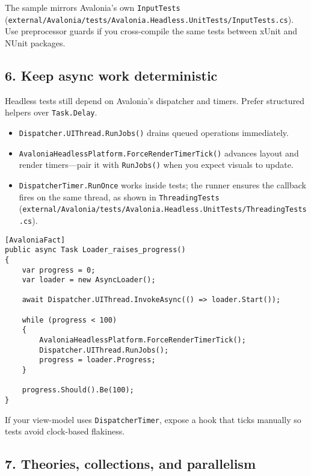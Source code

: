 The sample mirrors Avalonia's own \passthrough{\lstinline!InputTests!}
(\passthrough{\lstinline!external/Avalonia/tests/Avalonia.Headless.UnitTests/InputTests.cs!}).
Use preprocessor guards if you cross-compile the same tests between
xUnit and NUnit packages.

\subsection{6. Keep async work
deterministic}\label{keep-async-work-deterministic}

Headless tests still depend on Avalonia's dispatcher and timers. Prefer
structured helpers over \passthrough{\lstinline!Task.Delay!}.

\begin{itemize}
\tightlist
\item
  \passthrough{\lstinline!Dispatcher.UIThread.RunJobs()!} drains queued
  operations immediately.
\item
  \passthrough{\lstinline!AvaloniaHeadlessPlatform.ForceRenderTimerTick()!}
  advances layout and render timers---pair it with
  \passthrough{\lstinline!RunJobs()!} when you expect visuals to update.
\item
  \passthrough{\lstinline!DispatcherTimer.RunOnce!} works inside tests;
  the runner ensures the callback fires on the same thread, as shown in
  \passthrough{\lstinline!ThreadingTests!}
  (\passthrough{\lstinline!external/Avalonia/tests/Avalonia.Headless.UnitTests/ThreadingTests.cs!}).
\end{itemize}

\begin{lstlisting}
[AvaloniaFact]
public async Task Loader_raises_progress()
{
    var progress = 0;
    var loader = new AsyncLoader();

    await Dispatcher.UIThread.InvokeAsync(() => loader.Start());

    while (progress < 100)
    {
        AvaloniaHeadlessPlatform.ForceRenderTimerTick();
        Dispatcher.UIThread.RunJobs();
        progress = loader.Progress;
    }

    progress.Should().Be(100);
}
\end{lstlisting}

If your view-model uses \passthrough{\lstinline!DispatcherTimer!},
expose a hook that ticks manually so tests avoid clock-based flakiness.

\subsection{7. Theories, collections, and
parallelism}\label{theories-collections-and-parallelism}

